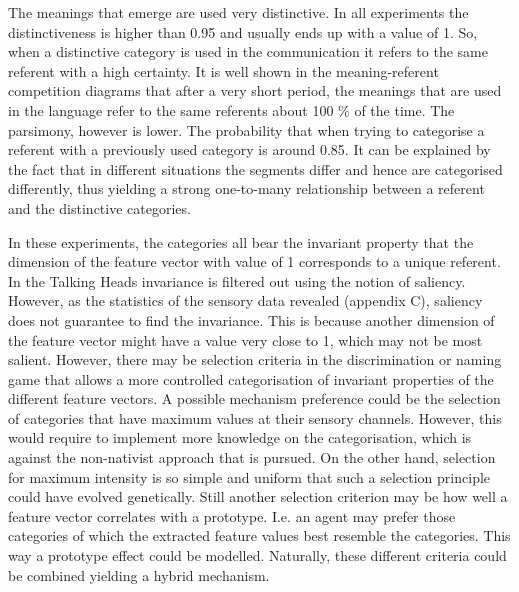 The meanings that emerge are used very distinctive. In all experiments the distinctiveness is higher than 0.95 and usually ends up with a value of 1. So, when a distinctive category is used in the communication it refers to the same referent with a high certainty. It is well shown in the meaning-referent competition diagrams that after a very short period, the meanings that are used in the language refer to the same referents about 100 \% of the time. The parsimony, however is lower. The probability that when trying to categorise a referent with a previously used category is around 0.85. It can be explained by the fact that in different situations the segments differ and hence are categorised differently, thus yielding a strong one-to-many relationship between a referent and the distinctive categories.

In these experiments, the categories all bear the invariant property that the dimension of the feature vector with value of 1 corresponds to a unique referent. In the Talking Heads invariance is filtered out using the notion of saliency. However, as the statistics of the sensory data revealed (appendix C), saliency does not guarantee to find the invariance. This is because another dimension of the feature vector might have a value very close to 1, which may not be most salient. However, there may be selection criteria in the discrimination or naming game that allows a more controlled categorisation of invariant properties of the different feature vectors. A possible mechanism preference could be the selection of categories that have maximum values at their sensory channels. However, this would require to implement more knowledge on the categorisation, which is against the non-nativist approach that is pursued. On the other hand, selection for maximum intensity is so simple and uniform that such a selection principle could have evolved genetically. Still another selection criterion may be how well a feature vector correlates with a prototype. I.e. an agent may prefer those categories of which the extracted feature values best resemble the categories. This way a prototype effect \citep{rosch:1976} could be modelled. Naturally, these different criteria could be combined yielding a hybrid mechanism.  


